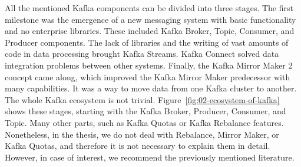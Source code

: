 All the mentioned Kafka components can be divided into three stages.
The first milestone was the emergence of a new messaging system with basic functionality and no enterprise libraries.
These included Kafka Broker, Topic, Consumer, and Producer components.
The lack of libraries and the writing of vast amounts of code in data processing brought Kafka Streams.
Kafka Connect solved data integration problems between other systems.
Finally, the Kafka Mirror Maker 2 concept came along, which improved the Kafka Mirror Maker predecessor with many capabilities.
It was a way to move data from one Kafka cluster to another.
The whole Kafka ecosystem is not trivial.
Figure~\ref{fig:02-ecosystem-of-kafka} shows these stages, starting with the Kafka Broker, Producer, Consumer, and Topic.
Many other parts, such as Kafka Quotas or Kafka Rebalance features.
Nonetheless, in the thesis, we do not deal with Rebalance, Mirror Maker, or Kafka Quotas, and therefore it is not necessary to explain them in detail.
However, in case of interest, we recommend the previously mentioned literature.